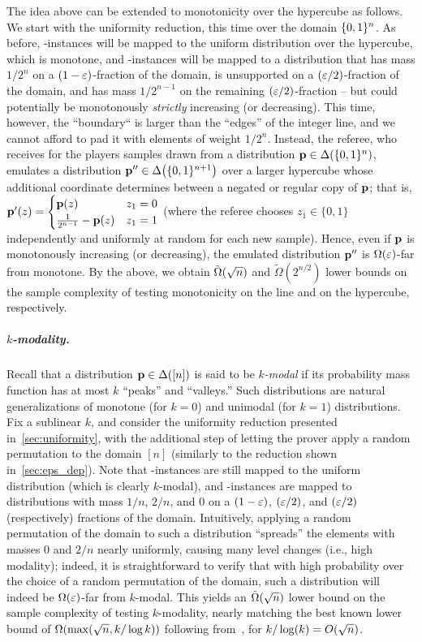  The idea above can be extended to monotonicity over the hypercube as follows. We start with the uniformity reduction, this time over the domain $\{0,1\}^n$. As before, \yes-instances will be mapped to the uniform distribution over the hypercube, which is monotone, and \no-instances will be mapped to a distribution that has mass $1/2^n$ on a $(1-\varepsilon)$-fraction of the domain, is unsupported on a $(\varepsilon/2)$-fraction of the domain, and has mass $1/2^{n-1}$ on the remaining $(\varepsilon/2)$-fraction -- but could potentially be monotonously \emph{strictly} increasing (or decreasing). This time, however, the ``boundary`` is larger than the ``edges'' of the integer line, and we cannot afford to pad it with elements of weight $1/2^n$. Instead, the referee, who receives for the players samples drawn from a distribution $\mathbf{p}\in\Delta\!\left(\{0,1\}^n\right)$, emulates a distribution $\mathbf{p}''\in\Delta\!\left(\{0,1\}^{n+1}\right)$ over a larger hypercube whose additional coordinate determines between a negated or regular copy of $\mathbf{p}$; that is, 
 $\mathbf{p}'(z) = 
 \begin{cases}
	\mathbf{p}(z) & z_1 = 0 \\
  \frac{1}{2^{n-1}} -\mathbf{p}(z) & z_1 = 1
 \end{cases}$ (where the referee chooses $z_1\in\{0,1\}$ independently and uniformly at random for each new sample). Hence, even if $\mathbf{p}$ is monotonously increasing (or decreasing), the emulated distribution $\mathbf{p}''$ is $\bigOmega{\eps}$-far from monotone.
 By the above, we obtain $\tildeOmega{\sqrt{n}}$ and $\tilde{\Omega}(2^{n/2})$ lower bounds on the sample complexity of testing monotonicity on the line and on the hypercube, respectively.
 

\subparagraph{$k$-modality.} Recall that a distribution $\mathbf{p}\in\Delta\!\left([n]\right)$ is said to be \emph{$k$-modal} if its probability mass function has at most $k$ ``peaks'' and ``valleys.'' Such distributions are natural generalizations of monotone (for $k = 0$) and unimodal (for $k = 1$) distributions. Fix a sublinear $k$, and consider the uniformity reduction presented in~\cref{sec:uniformity}, with the additional step of letting the prover apply a random permutation to the domain $[n]$ (similarly to the reduction shown in~\cref{sec:eps_dep}). Note that \yes-instances are still mapped to the uniform distribution (which is clearly $k$-modal), and \no-instances are mapped to distributions with mass $1/n$, $2/n$, and $0$ on a $(1-\varepsilon)$, $(\varepsilon/2)$, and $(\varepsilon/2)$ (respectively) fractions of the domain. Intuitively, applying a random permutation of the domain to such a distribution ``spreads'' the elements with masses $0$ and $2/n$ nearly uniformly, causing many level changes (i.e., high modality); indeed, it is straightforward to verify that with high probability over the choice of a random permutation of the domain, such a distribution will indeed be $\bigOmega{\eps}$-far from $k$-modal. This yields an $\tildeOmega{\sqrt{n}}$ lower bound on the sample complexity of testing $k$-modality, nearly matching the best known lower bound of $\bigOmega{\max( \sqrt{n}, k/\log k)}$ following from~\cite{Canonne:16}, for $k/\log(k) = \bigO{\sqrt{n}}$.

